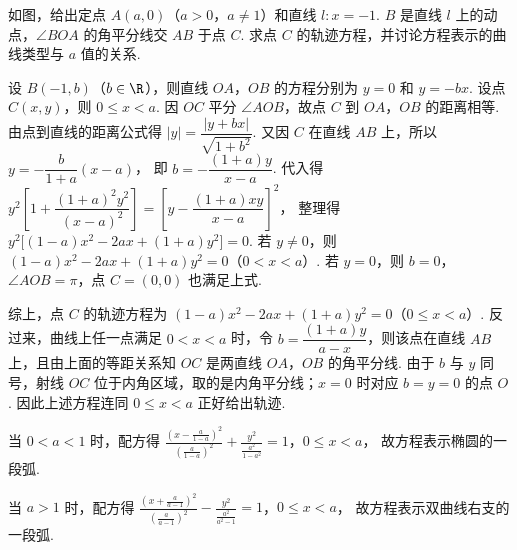 \begin{problem}
如图，给出定点 \(A(a,0)\)（\(a>0\)，\(a\neq 1\)）和直线 \(l:x=-1\). \(B\) 是直线 \(l\) 上的动点，\(\angle BOA\) 的角平分线交 \(AB\) 于点 \(C\). 求点 \(C\) 的轨迹方程，并讨论方程表示的曲线类型与 \(a\) 值的关系.

\end{problem}

\begin{solution}
设 \(B(-1,b)\)（\(b\in\R\)），则直线 \(OA\)，\(OB\) 的方程分别为 \(y=0\) 和 \(y=-bx\).
设点 \(C(x,y)\)，则 \(0\le x<a\). 因 \(OC\) 平分 \(\angle AOB\)，故点 \(C\) 到 \(OA\)，\(OB\) 的距离相等. 由点到直线的距离公式得 \( |y|=\dfrac{|y+bx|}{\sqrt{1+b^2}} \).
又因 \(C\) 在直线 \(AB\) 上，所以 \(y=-\dfrac{b}{1+a}(x-a)\)，
即 \(b=-\dfrac{(1+a)y}{x-a}\).
代入得
\(y^2\left[1+\dfrac{(1+a)^2y^2}{(x-a)^2}\right]
=\left[y-\dfrac{(1+a)xy}{x-a}\right]^2\)，
整理得 \(y^2\bigl[(1-a)x^2-2ax+(1+a)y^2\bigr]=0\).
若 \(y\neq 0\)，则 \((1-a)x^2-2ax+(1+a)y^2=0\)（\(0<x<a\)）.
若 \(y=0\)，则 \(b=0\)，\(\angle AOB=\pi\)，点 \(C=(0,0)\) 也满足上式.

综上，点 \(C\) 的轨迹方程为
\((1-a)x^2-2ax+(1+a)y^2=0\)（\(0\le x<a\)）. 反过来，曲线上任一点满足 \(0<x<a\) 时，令
\(b=\dfrac{(1+a)y}{a-x}\)，则该点在直线 \(AB\) 上，且由上面的等距关系知 \(OC\) 是两直线 \(OA\)，\(OB\) 的角平分线. 由于 \(b\) 与 \(y\) 同号，射线 \(OC\) 位于内角区域，取的是内角平分线；\(x=0\) 时对应 \(b=y=0\) 的点 \(O\). 因此上述方程连同 \(0\le x<a\) 正好给出轨迹.

当 \(0<a<1\) 时，配方得
\(\frac{\left(x-\frac{a}{1-a}\right)^2}{\left(\frac{a}{1-a}\right)^2} +\frac{y^2}{\frac{a^2}{1-a^2}}=1\)，\(0\le x<a\)，
故方程表示椭圆的一段弧.

当 \(a>1\) 时，配方得
\(\frac{\left(x+\frac{a}{a-1}\right)^2}{\left(\frac{a}{a-1}\right)^2} -\frac{y^2}{\frac{a^2}{a^2-1}}=1\)，\(0\le x<a\)，
故方程表示双曲线右支的一段弧.
\end{solution}
